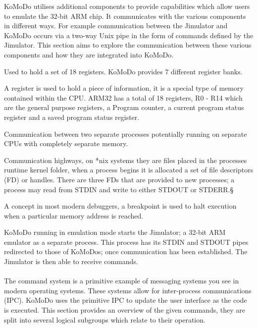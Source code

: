 KoMoDo utilises additional components to provide capabilities which allow users to emulate the 32-bit ARM chip. It communicates with the various components in different ways. For example communication between the Jimulator and KoMoDo occurs via a two-way Unix pipe in the form of commands defined by the Jimulator. This section aims to explore the communication between these various components and how they are integrated into KoMoDo.

  \begin{description}[leftmargin=!,labelwidth=\widthof{\bfseries \footnotesize inter process communication}]
    \item[\footnotesize Register bank] Used to hold a set of 18 registers. KoMoDo provides 7 different register banks.
    \item[\footnotesize Register] A register is used to hold a piece of information, it is a special type of memory contained within the CPU. ARM32 has a total of 18 registers, R0 - R14 which are the general purpose registers, a Program counter, a current program status register and a saved program status register.
    \item[\footnotesize Inter process communication] Communication between two separate processes potentially running on separate CPUs with completely separate memory.
    \item[\footnotesize (*nix) pipes] Communication highways, on *nix systems they are files placed in the processes runtime kernel folder, when a process begins it is allocated a set of file descriptors (FD) or handles. There are three FDs that are provided to new processes; a process may read from STDIN and write to  either STDOUT or STDERR.§
    \item[\footnotesize breakpoint] A concept in most modern debuggers, a breakpoint is used to halt execution when a particular memory address is reached.
  \end{description}
%
KoMoDo running in emulation mode starts the Jimulator; a 32-bit ARM emulator as a separate process. This process has its STDIN and STDOUT pipes redirected to those of KoMoDos; once communication has been established. The Jimulator is then able to receive commands.\\\\
%
The command system is a primitive example of messaging systems you see in modern operating systems. These systems allow for inter-process communications (IPC). KoMoDo uses the primitive IPC to update the user interface as the code is executed. This section provides an overview of the given commands, they are split into several logical subgroups which relate to their operation.
